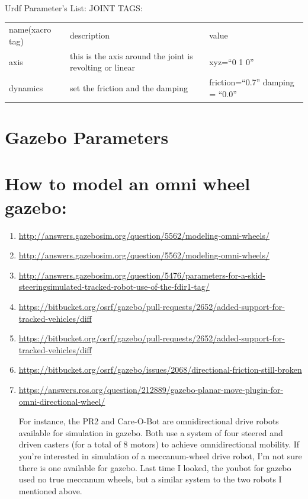 \documentclass[twoside,colorback,accentcolor=tud4c,11pt]{tudreport}
\begin{document}
	Urdf Parameter's List: JOINT TAGS:\\
	\begin{tabular}{l l l}
		name(xacro tag)&description&value\\
		axis&this is the axis around the joint is revolting or linear &xyz=``0 1 0''\\
		dynamics&set the friction and the damping &friction=``0.7'' damping = ``0.0''\\
	\end{tabular}

\section{Gazebo Parameters}

\section{How to model an omni wheel gazebo:}
\begin{enumerate}
	\item \url{http://answers.gazebosim.org/question/5562/modeling-omni-wheels/}
	\item \url{http://answers.gazebosim.org/question/5562/modeling-omni-wheels/}
	\item \url{http://answers.gazebosim.org/question/5476/parameters-for-a-skid-steeringsimulated-tracked-robot-use-of-the-fdir1-tag/}
	\item \url{https://bitbucket.org/osrf/gazebo/pull-requests/2652/added-support-for-tracked-vehicles/diff}
	\item \url{https://bitbucket.org/osrf/gazebo/pull-requests/2652/added-support-for-tracked-vehicles/diff}
	\item \url{https://bitbucket.org/osrf/gazebo/issues/2068/directional-friction-still-broken}
	
	\item \url{https://answers.ros.org/question/212889/gazebo-planar-move-plugin-for-omni-directional-wheel/}
	
	
	For instance, the PR2 and Care-O-Bot are omnidirectional drive robots available for simulation in gazebo. Both use a system of four steered and driven casters (for a total of 8 motors) to achieve omnidirectional mobility. If you're interested in simulation of a meccanum-wheel drive robot, I'm not sure there is one available for gazebo. Last time I looked, the youbot for gazebo used no true meccanum wheels, but a similar system to the two robots I mentioned above.
\end{enumerate}
\end{document}
